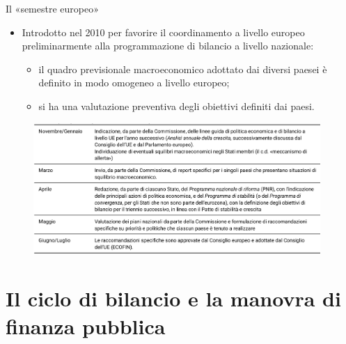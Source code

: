 \documentclass[aspectratio=64,11pt]{beamer}
\begin{document}
\begin{frame}{Il «semestre europeo»}

  \begin{itemize}
  \item Introdotto nel 2010 per favorire il coordinamento a livello europeo
    preliminarmente alla programmazione di bilancio a livello nazionale:
    \begin{itemize}
    \item il quadro previsionale macroeconomico adottato dai diversi paesei è
      definito in modo omogeneo a livello europeo;
    \item si ha una valutazione preventiva degli obiettivi definiti dai paesi.
    \end{itemize}
  \end{itemize}

  \begin{figure}[htbp]
    \centering
    \includegraphics[height=5cm]{./figure/semestre-europeo.png}
  \end{figure}
\end{frame}


\section{Il ciclo di bilancio e la manovra di finanza pubblica}
\end{document}
